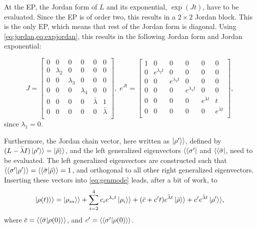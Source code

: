 \documentclass[../main.tex]{subfiles}
\begin{document}
At the EP, the Jordan form of $L$ and its exponential, $\exp{(Jt)}$, have to be evaluated. Since the EP is of order two, this results in a $2\times2$ Jordan block. This is the only EP, which means that rest of the Jordan form is diagonal. Using \cref{eq:jordan,eq:expjordan}, this results in the following Jordan form and Jordan exponential:

\begin{equation}
    J = \begin{bmatrix} 0 & 0 & 0 & 0 & 0 & 0 \\
                        0 & \lambda_2 & 0 & 0 & 0 & 0 \\
                        0 & 0 & \lambda_3 & 0 & 0 & 0 \\
                        0 & 0 & 0 & \lambda_4 & 0 & 0 \\
                        0 & 0 & 0 & 0 & \bar \lambda & 1 \\
                        0 & 0 & 0 & 0 & 0 & \bar \lambda \\ \end{bmatrix}, \; 
        e^{Jt} = \begin{bmatrix} 1 & 0 & 0 & 0 & 0 & 0 \\
            0 & e^{\lambda_2t} & 0 & 0 & 0 & 0 \\
            0 & 0 & e^{\lambda_3t} & 0 & 0 & 0 \\
            0 & 0 & 0 & e^{\lambda_4t} & 0 & 0 \\
            0 & 0 & 0 & 0 & e^{\bar \lambda t} & t \\
        0 & 0 & 0 & 0 & 0 & e^{\bar \lambda t} \\ \end{bmatrix},
\end{equation}
since $\lambda_1 = 0$.

Furthermore, the Jordan chain vector, here written as $\ket{\rho'}\rangle$, defined by\\${(L - \bar\lambda I)\ket{\rho'}\rangle = \ket{\bar\rho}\rangle}$, and the left generalized eigenvectors $\langle\bra{\sigma'}$ and $\langle\bra{\bar\sigma}$, need to be evaluated. The left generalized eigenvectors are constructed such that $\langle\braket{\sigma'|\rho'}\rangle = \langle\braket{\bar\sigma|\bar\rho}\rangle = 1$, and orthogonal to all other right generalized eigenvectors. Inserting these vectors into \cref{eq:genmode} leads, after a bit of work, to
\begin{equation}\label{eq:dynep}
    \begin{aligned}
        \ket{\rho(t)}\rangle = \ket{\rho_{ss}}\rangle + \sum_{i=2}^4 c_i e^{\lambda_i t} \ket{\rho_i}\rangle  
                                + (\bar c + c't)e^{\bar \lambda t}\ket{\bar \rho}\rangle + c'e^{\bar\lambda t}\ket{\rho'}\rangle,
    \end{aligned}
\end{equation}
where $\bar c = \langle\braket{\bar\sigma|\rho(0)}\rangle$, and $c' = \langle\braket{\sigma'|\rho(0)}\rangle$.
\end{document}
